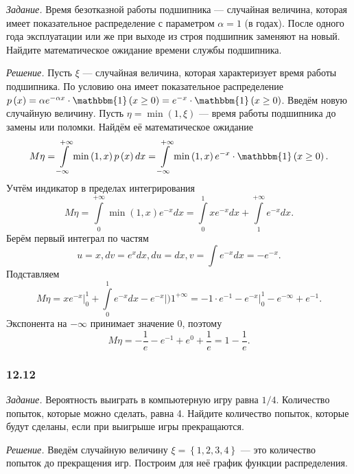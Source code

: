 \textit{Задание.} Время безотказной работы подшипника --- случайная величина, которая имеет показательное распределение с параметром $ \alpha = 1$ (в годах).
После одного года эксплуатации или же при выходе из строя подшипник заменяют на новый.
Найдите математическое ожидание времени службы подшипника.

\textit{Решение.} Пусть $ \xi $ --- случайная величина, которая характеризует время работы подшипника.
По условию она имеет показательное распределение
$p \left( x \right) =
\alpha e^{- \alpha x} \cdot \mathbbm{1} \left( x \geq 0 \right) =
e^{-x} \cdot \mathbbm{1} \left( x \geq 0 \right) $.
Введём новую случайную величину.
Пусть $ \eta  = \min \left( 1, \xi \right) $ --- время работы подшипника до замены или поломки.
Найдём её математическое ожидание
$$M \eta =
\int \limits_{- \infty }^{+ \infty } \min \left( 1, x \right) p \left( x \right) dx =
\int \limits_{- \infty }^{+ \infty } \min \left( 1, x \right) e^{-x} \cdot \mathbbm{1} \left( x \geq 0 \right).$$
Учтём индикатор в пределах интегрирования
$$M \eta =
\int \limits_0^{+ \infty } \min \left( 1, x \right) e^{-x} dx =
\int \limits_0^1 xe^{-x} dx + \int \limits_1^{+ \infty } e^{-x} dx.$$
Берём первый интеграл по частям
$$u = x,
dv = e^{x}dx,
du = dx, 
v = \int e^{-x} dx = -e^{-x}.$$
Подставляем
$$M \eta =
\left. xe^{-x} \right|_0^1 + \int \limits_0^1 e^{-x} dx - \left. e^{-x} \right|)1^{+ \infty } =
-1 \cdot e^{-1} - \left. e^{-x} \right|_0^1 - e^{- \infty } + e^{-1}.$$
Экспонента на $- \infty $ принимает значение 0, поэтому
$$M \eta = 
- \frac{1}{e} - e^{-1} + e^0 + \frac{1}{e} =
1 - \frac{1}{e}.$$

\subsubsection*{12.12}

\textit{Задание.} Вероятность выиграть в компьютерную игру равна $1/4$.
Количество попыток, которые можно сделать, равна 4.
Найдите количество попыток, которые будут сделаны, если при выигрыше игры прекращаются.

\textit{Решение.} Введём случайную величину $ \xi = \left\{ 1, 2, 3, 4 \right\} $ --- это количество попыток до прекращения игр.
Построим для неё график функции распределения.

